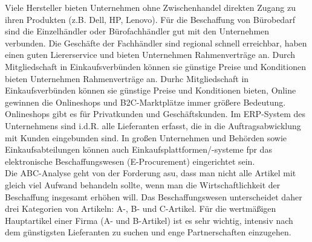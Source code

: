 \documentclass[a4paper, 12pt]{report}
\begin{document}
Viele Hersteller bieten Unternehmen ohne Zwischenhandel direkten Zugang zu ihren
Produkten (z.B. Dell, HP, Lenovo). Für die Beschaffung von Bürobedarf sind die 
Einzelhändler oder Bürofachhändler gut mit den Unternehmen verbunden. Die 
Geschäfte der Fachhändler sind regional schnell erreichbar, haben einen guten 
Liererservice und bieten Unternehmen Rahmenverträge an. Durch Mitgliedschaft 
in Einkaufsverbünden können sie günstige Preise und Konditionen bieten 
Unternehmen Rahmenverträge an. Durhc Mitgliedschaft in Einkaufsverbünden können
sie günstige Preise und Konditionen bieten, Online gewinnen die Onlineshops und 
B2C-Marktplätze immer größere Bedeutung. Onlineshops gibt es für Privatkunden 
und Geschäftskunden. Im ERP-System des Unternehmens sind i.d.R. alle Lieferanten 
erfasst, die in die Auftragsabwicklung mit Kunden eingebunden sind. In großen 
Unternehmen und Behörden sowie Einkaufsabteilungen können auch 
Einkaufsplattformen/-systeme fpr das elektronische Beschaffungswesen 
(E-Procurement) eingerichtet sein. \\

Die ABC-Analyse geht von der Forderung asu, dass man nicht alle Artikel mit 
gleich viel Aufwand behandeln sollte, wenn man die Wirtschaftlichkeit der 
Beschaffung insgesamt erhöhen will. Das Beschaffungswesen unterscheidet daher
drei Kategorien von Artikeln: A-, B- und C-Artikel. Für die wertmäßigen 
Hauptartikel einer Firma (A- und B-Artikel) ist es sehr wichtig, intensiv nach
dem günstigsten Lieferanten zu suchen und enge Partnerschaften einzugehen. 
\end{document}
